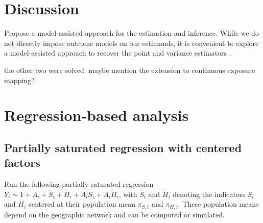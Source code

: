 \documentclass{article}
\newcommand{\tS}{\tilde{S}}
\newcommand{\tH}{\tilde{H}}
\begin{document}
\section{Discussion}     
Propose a model-assisted approach for the estimation and inference. While we do not directly impose outcome models on our estimands, it is convenient to explore a model-assisted approach to recover the point and variance estimators \citep{zhao2022reconciling}. 

the other two were solved. maybe mention the extension to continuous exposure mapping? 










\appendix 

\section{Regression-based analysis}
\subsection{Partially saturated regression with centered factors}
Run the following partially saturated regression $Y_i \sim 1+A_i + \tS_i + \tH_i + A_i\tS_i + A_i \tH_i $, with $\tS_i$ and $\tH_i$ denoting the indicators $S_i$ and $H_i$ centered at their population mean $\pi_{S,i}$ and $\pi_{H,i}$. These population means depend on the geographic network and can be computed or simulated. 
\end{document}
